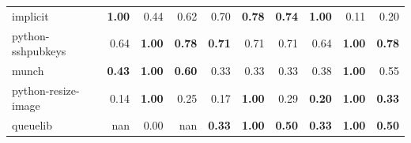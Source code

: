 \documentclass[submit,noauthor,dvipdfmx]{ipsj}
\begin{document}
\begin{table}{}
{\begin{tabular}{l||p{4em}|p{4em}|p{4em}||p{4em}|p{4em}|p{4em}||p{4em}|p{4em}|p{4em}}
            \hline \hline
            implicit & \multicolumn{1}{r|}{\textbf{1.00}} & \multicolumn{1}{r|}{0.44} & \multicolumn{1}{r||}{0.62} & \multicolumn{1}{r|}{0.70} & \multicolumn{1}{r|}{\textbf{0.78}} & \multicolumn{1}{r||}{\textbf{0.74}} & \multicolumn{1}{r|}{\textbf{1.00}} & \multicolumn{1}{r|}{0.11} & \multicolumn{1}{r}{0.20} \\
            python-sshpubkeys & \multicolumn{1}{r|}{0.64} & \multicolumn{1}{r|}{\textbf{1.00}} & \multicolumn{1}{r||}{\textbf{0.78}} & \multicolumn{1}{r|}{\textbf{0.71}} & \multicolumn{1}{r|}{0.71} & \multicolumn{1}{r||}{0.71} & \multicolumn{1}{r|}{0.64} & \multicolumn{1}{r|}{\textbf{1.00}} & \multicolumn{1}{r}{\textbf{0.78}} \\
            munch & \multicolumn{1}{r|}{\textbf{0.43}} & \multicolumn{1}{r|}{\textbf{1.00}} & \multicolumn{1}{r||}{\textbf{0.60}} & \multicolumn{1}{r|}{0.33} & \multicolumn{1}{r|}{0.33} & \multicolumn{1}{r||}{0.33} & \multicolumn{1}{r|}{0.38} & \multicolumn{1}{r|}{\textbf{1.00}} & \multicolumn{1}{r}{0.55} \\
            python-resize-image & \multicolumn{1}{r|}{0.14} & \multicolumn{1}{r|}{\textbf{1.00}} & \multicolumn{1}{r||}{0.25} & \multicolumn{1}{r|}{0.17} & \multicolumn{1}{r|}{\textbf{1.00}} & \multicolumn{1}{r||}{0.29} & \multicolumn{1}{r|}{\textbf{0.20}} & \multicolumn{1}{r|}{\textbf{1.00}} & \multicolumn{1}{r}{\textbf{0.33}} \\
            queuelib & \multicolumn{1}{r|}{nan} & \multicolumn{1}{r|}{0.00} & \multicolumn{1}{r||}{nan} & \multicolumn{1}{r|}{\textbf{0.33}} & \multicolumn{1}{r|}{\textbf{1.00}} & \multicolumn{1}{r||}{\textbf{0.50}} & \multicolumn{1}{r|}{\textbf{0.33}} & \multicolumn{1}{r|}{\textbf{1.00}} & \multicolumn{1}{r}{\textbf{0.50}} \\ \hline
        \end{tabular}
    }
\end{table}
\end{document}
